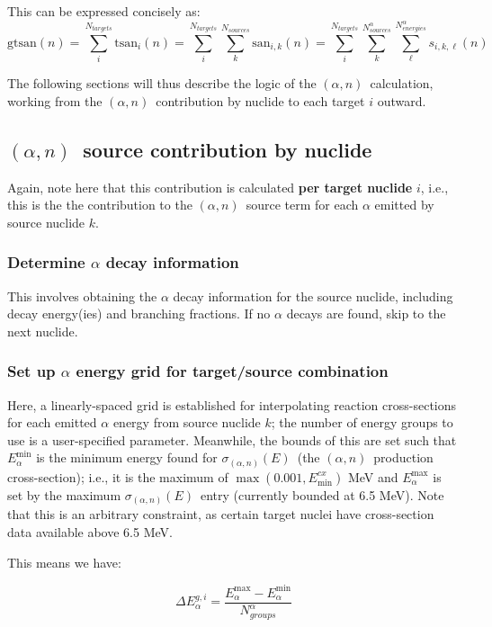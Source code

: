 \documentclass[10pt]{article}
\newcommand{\alphn}[0]{$\left(\alpha,n\right)$}
\newcommand{\sigan}[0]{\sigma_{\left(\alpha,n\right)}}
\begin{document}
This can be expressed concisely as:
\begin{equation}
\displaystyle \mathrm{gtsan}\left(n\right) = \sum_{i}^{N_{targets}} \mathrm{tsan}_i(n) = \sum_{i}^{N_{targets}} \sum_{k}^{N_{sources}} \mathrm{san}_{i,k}(n) = \sum_{i}^{N_{targets}} \sum_{k}^{N^\alpha_{sources}} \sum_{\ell}^{N^\alpha_{energies}} s_{i,k,\ell}(n)
\end{equation}

The following sections will thus describe the logic of the \alphn\ calculation, working from the \alphn\ contribution by nuclide to each target $i$ outward.

\subsection{\alphn\ source contribution by nuclide}
Again, note here that this contribution is calculated \textbf{per target nuclide} $i$, i.e., this is the the contribution to the \alphn\ source term for each $\alpha$ emitted by source nuclide $k$.

\subsubsection{Determine $\alpha$ decay information}

This involves obtaining the $\alpha$ decay information for the source nuclide, including decay energy(ies) and branching fractions. If no $\alpha$ decays are found, skip to the next nuclide.

\subsubsection{Set up $\alpha$ energy grid for target/source combination}
Here, a linearly-spaced grid is established for interpolating reaction cross-sections for each emitted $\alpha$ energy from source nuclide $k$; the number of energy groups to use is a user-specified parameter. Meanwhile, the bounds of this are set such that $E_\alpha^{\min}$ is the minimum energy found for $\sigan\left(E\right)$\ (the \alphn\ production cross-section); i.e., it is the maximum of $\max \left(0.001,E^{cx}_{\min} \right)$ MeV and $E_\alpha^{\max}$ is set by the maximum $\sigan\left(E\right)$\ entry (currently bounded at 6.5 MeV). Note that this is an arbitrary constraint, as certain target nuclei have cross-section data available above 6.5 MeV.

This means we have:

\begin{equation}
\Delta E_\alpha^{g,i} = \frac{E_\alpha^{\max} - E_\alpha^{\min} }{N^\alpha_{groups}}
\end{equation}
\end{document}
